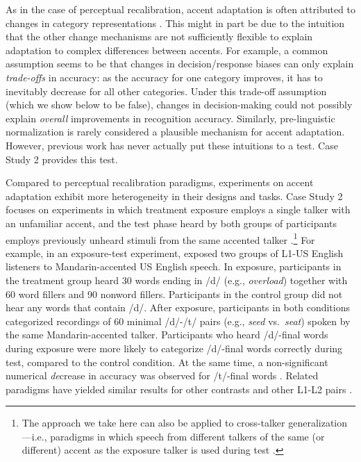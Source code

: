 \documentclass[
  11pt,
  man,floatsintext]{apa6}
\begin{document}
As in the case of perceptual recalibration, accent adaptation is often attributed to changes in category representations \autocites[e.g.,][]{bent-baeseberk2021,sidaras2009,eisner2013,sumner2009,tzeng2016,xie2016jep}. This might in part be due to the intuition that the other change mechanisms are not sufficiently flexible to explain adaptation to complex differences between accents. For example, a common assumption seems to be that changes in decision/response biases can only explain \emph{trade-offs} in accuracy: as the accuracy for one category improves, it has to inevitably decrease for all other categories. Under this trade-off assumption (which we show below to be false), changes in decision-making could not possibly explain \emph{overall} improvements in recognition accuracy. Similarly, pre-linguistic normalization is rarely considered a plausible mechanism for accent adaptation. However, previous work has never actually put these intuitions to a test. Case Study 2 provides this test.

Compared to perceptual recalibration paradigms, experiments on accent adaptation exhibit more heterogeneity in their designs and tasks. Case Study 2 focuses on experiments in which treatment exposure employs a single talker with an unfamiliar accent, and the test phase heard by both groups of participants employs previously unheard stimuli from the same accented talker \autocites[e.g.,][]{eisner2013,schertz2015,xie2017}.\footnote{The approach we take here can also be applied to cross-talker generalization---i.e., paradigms in which speech from different talkers of the same (or different) accent as the exposure talker is used during test \autocite{baeseberk2013,bradlow-bent2008,sidaras2009}.} For example, in an exposure-test experiment, \textcite{xie2016jep} exposed two groups of L1-US English listeners to Mandarin-accented US English speech. In exposure, participants in the treatment group heard 30 words ending in /d/ (e.g., \emph{overload}) together with 60 word fillers and 90 nonword fillers. Participants in the control group did not hear any words that contain /d/. After exposure, participants in both conditions categorized recordings of 60 minimal /d/-/t/ pairs (e.g., \emph{seed} vs.~\emph{seat}) spoken by the same Mandarin-accented talker. Participants who heard /d/-final words during exposure were more likely to categorize /d/-final words correctly during test, compared to the control condition. At the same time, a non-significant numerical \emph{de}crease in accuracy was observed for /t/-final words \autocite[see also][]{xie2018lcn}. Related paradigms have yielded similar results for other contrasts and other L1-L2 pairs \autocites[e.g.,][]{zheng-samuel2020,eisner2013}.
\end{document}
